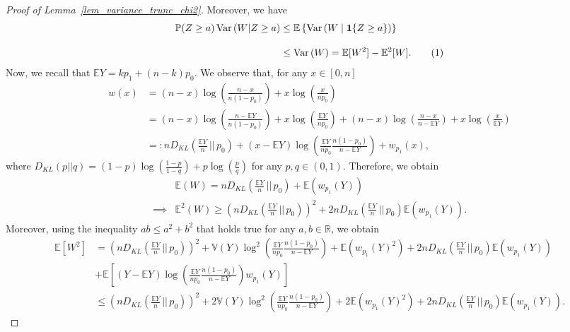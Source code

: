 \documentclass{article}
\newcommand{\R}{\mathbb{R}}
\newcommand{\one}{\mathbf{1}}
\newcommand\numberthis{\addtocounter{equation}{1}\tag{\theequation}}
\begin{document}
\begin{proof}[Proof of Lemma~\ref{lem_variance_trunc_chi2}]
Moreover, we have
\begin{align*}
\mathbb{P}(Z \geq a) \operatorname{Var}\left(W| Z \geq a\right) & \leq \mathbb{E}\left\{\operatorname{Var}\left(W \mid \one{\{Z \geq a\}}\right)\right\} \\[9pt]
& \leq \operatorname{Var}\left(W\right) = \mathbb E [W^2] - \mathbb E^2[W].\numberthis\label{eq_first_part_variance_H1}
\end{align*}
Now, we recall that $\mathbb EY = kp_1 + (n-k)p_0$. 
We observe that, for any $x \in [0,n]$
\begin{align*}
    w(x) &= (n-x) \log\left(\frac{n-x}{n(1-p_0)}\right) + x \log\left(\frac{x}{np_0}\right)\\
    & = (n-x) \log\left(\frac{n-\mathbb E Y}{n(1-p_0)}\right) + x \log\left(\frac{\mathbb E Y}{np_0}\right) + (n-x) \log\left(\frac{n-x}{n - \mathbb E Y}\right) + x \log\left(\frac{x}{\mathbb EY}\right)\\
    & =: nD_{KL}\left(\frac{\mathbb EY}{n} \, \Big|\Big|\,p_0\right) + (x-\mathbb EY) \log\left(\frac{\mathbb EY}{np_0}\frac{n(1-p_0)}{n-\mathbb EY}\right) + w_{p_1}(x),
\end{align*}
where $D_{KL}(p||q) = (1-p) \log\left(\frac{1-p}{1-q}\right) + p \log\left(\frac{p}{q}\right)$ for any $p,q \in (0,1)$.
Therefore, we obtain
\begin{align*}
    &\mathbb E(W) = nD_{KL}\left(\frac{\mathbb EY}{n} \, \Big|\Big|\,p_0\right) + \mathbb E(w_{p_1}(Y))\\
    \implies & \mathbb E^2(W) \geq \left(nD_{KL}\left(\frac{\mathbb EY}{n} \, \Big|\Big|\,p_0\right)\right)^2 + 2nD_{KL}\left(\frac{\mathbb EY}{n} \, \Big|\Big|\,p_0\right)\mathbb E(w_{p_1}(Y)).
\end{align*}
Moreover, using the inequality $ab \leq a^2+b^2$ that holds true for any $a,b\in \R$, we obtain
\begin{align*}
    \mathbb E [W^2] &= \left(nD_{KL}\left(\frac{\mathbb EY}{n} \, \Big|\Big|\,p_0\right)\right)^2 + \mathbb V(Y) \log^2\left(\frac{\mathbb EY}{np_0}\frac{n(1-p_0)}{n-\mathbb EY}\right) + \mathbb E (w_{p_1}(Y)^2) + 2 nD_{KL}\left(\frac{\mathbb EY}{n} \, \Big|\Big|\,p_0\right)\mathbb E(w_{p_1}(Y)) \\
    & + \mathbb E \left[(Y-\mathbb EY) \log\left(\frac{\mathbb EY}{np_0}\frac{n(1-p_0)}{n-\mathbb EY}\right)  w_{p_1}(Y)\right]\\
    &\leq \left(nD_{KL}\left(\frac{\mathbb EY}{n} \, \Big|\Big|\,p_0\right)\right)^2 + 2\mathbb V(Y) \log^2\left(\frac{\mathbb EY}{np_0}\frac{n(1-p_0)}{n-\mathbb EY}\right) + 2 \mathbb E (w_{p_1}(Y)^2) + 2 nD_{KL}\left(\frac{\mathbb EY}{n} \, \Big|\Big|\,p_0\right)\mathbb E(w_{p_1}(Y)).

\end{align*}
\end{proof}
\end{document}
